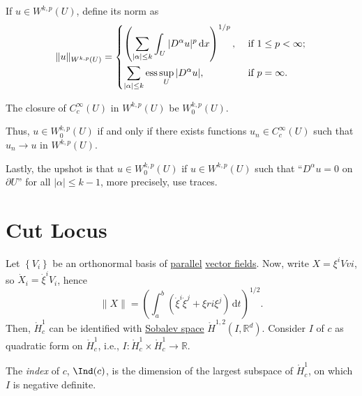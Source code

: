 \begin{definition}
	If \(u\in W^{k, p}(U)\), define its norm as
	\[
		\lVert u \rVert_{W^{k, p}(U)} = \begin{dcases}
			\left( \sum_{\vert \alpha \vert \leq k} \int _U \vert D^\alpha u \vert ^p \,\mathrm{d} x \right)^{1 / p} , & \text{ if } 1 \leq p < \infty ; \\
			\sum_{\vert \alpha \vert \leq k} \mathrm{ess} \sup _U \vert D^\alpha u \vert ,                             & \text{ if } p = \infty .
		\end{dcases}
	\]
\end{definition}

\begin{notation}
	The closure of \(C_c^{\infty} (U)\) in \(W^{k, p}(U)\) be \(W_0^{k, p}(U)\).
\end{notation}

Thus, \(u\in W_0^{k, p}(U)\) if and only if there exists functions \(u_n \in C_c^{\infty} (U)\) such that \(u_n \to u\) in \(W^{k, p}(U)\).

\begin{remark}
	Lastly, the upshot is that \(u\in W^{k, p}_0(U)\) if \(u\in W^{k, p}(U)\) such that ``\(D^\alpha u=0\) on \(\partial U\)'' for all \(\vert \alpha \vert \leq k - 1\), more precisely, use traces.
\end{remark}

\section{Cut Locus}
Let \(\left\{ V_i \right\} \) be an orthonormal basis of \hyperref[def:parallel]{parallel} \hyperref[def:vector-field]{vector fields}. Now, write \(X = \xi ^i Vvi\), so \(\dot{X} _i = \dot{\xi }^i V_i \), hence
\[
	\lVert X \rVert = \left( \int_{a}^{b} \left( \dot{\xi }^i \dot{\xi }^j + \xi ri \xi ^j \right)  \,\mathrm{d}t \right) ^{1 / 2}.
\]
Then, \(\mathring{H}_c^1\) can be identified with \hyperref[def:Sobalev-space]{Sobalev space} \(\mathring{H}^{1, 2}(I, \mathbb{R} ^d)\). Consider \(I\) of \(c\) as quadratic form on \(\mathring{H}^1_c \), i.e., \(I\colon \mathring{H}^1_c \times \mathring{H}^1_c \to \mathbb{R} \).

\begin{definition}[Index]\label{def:index}
	The \emph{index} of \(c\), \(\Ind(c)\), is the dimension of the largest subspace of \(\mathring{H}_c^1\), on which \(I\) is negative definite.
\end{definition}

